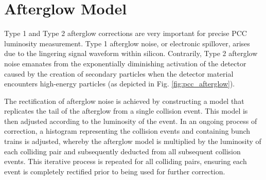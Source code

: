 \section{Afterglow Model}

Type 1 and Type 2 afterglow corrections are very important for precise PCC luminosity measurement. Type 1 afterglow noise, or electronic spillover, arises due to the lingering signal waveform within silicon. Contrarily, Type 2 afterglow noise emanates from the exponentially diminishing activation of the detector caused by the creation of secondary particles when the detector material encounters high-energy particles \cite{CMS-PAS-SMP-12-008}(as depicted in Fig. \ref{fig:pcc_afterglow}).

The rectification of afterglow noise is achieved by constructing a model that replicates the tail of the afterglow from a single collision event. This model is then adjusted according to the luminosity of the event. In an ongoing process of correction, a histogram representing the collision events and containing bunch trains is adjusted, whereby the afterglow model is multiplied by the luminosity of each colliding pair and subsequently deducted from all subsequent collision events. This iterative process is repeated for all colliding pairs, ensuring each event is completely rectified prior to being used for further correction.

